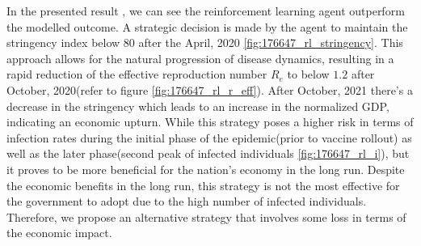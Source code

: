 \documentclass[tikz,fleqn,12pt]{wlscirep}
\begin{document}
In the presented result , we can see the reinforcement learning agent outperform the modelled outcome. A strategic decision is made by the agent to maintain the stringency index below 80 after the April, 2020 \cref{fig:176647_rl_stringency}. This approach allows for the natural progression of disease dynamics, resulting in a rapid reduction of the effective reproduction number $R_e$ to below $1.2$ after October, 2020(refer to figure \cref{fig:176647_rl_r_eff}). After October, 2021 there's a decrease in the stringency which leads to an increase in the normalized GDP, indicating an economic upturn. While this strategy poses a higher risk in terms of infection rates during the initial phase of the epidemic(prior to vaccine rollout) as well as the later phase(second peak of infected individuals \cref{fig:176647_rl_i}), but it proves to be more beneficial for the nation's economy in the long run. Despite the economic benefits in the long run, this strategy is not the most effective for the government to adopt due to the high number of infected individuals. Therefore, we propose an alternative strategy that involves some loss in terms of the economic impact.
\end{document}

